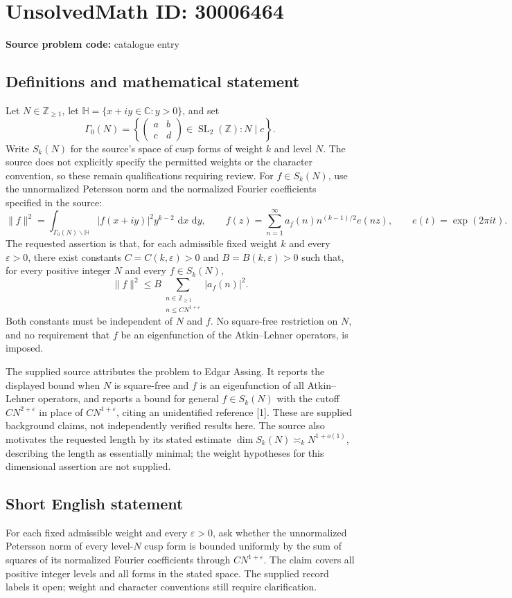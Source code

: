 \documentclass[11pt]{article}
\newcommand{\Z}{\mathbb{Z}}
\newcommand{\C}{\mathbb{C}}
\newcommand{\dd}{\,\mathrm{d}}
\begin{document}
\section*{UnsolvedMath ID: 30006464}
\textbf{Source problem code:} catalogue entry
\subsection{Definitions and mathematical statement}
Let \(N\in\Z_{\geq 1}\), let \(\mathbb H=\{x+iy\in\C:y>0\}\), and set
\[
\Gamma_0(N)=\left\{\begin{pmatrix}a&b\\c&d\end{pmatrix}\in\operatorname{SL}_2(\Z):N\mid c\right\}.
\]
Write \(S_k(N)\) for the source's space of cusp forms of weight \(k\) and level \(N\). The source does not explicitly specify the permitted weights or the character convention, so these remain qualifications requiring review. For \(f\in S_k(N)\), use the unnormalized Petersson norm and the normalized Fourier coefficients specified in the source:
\[
\|f\|^2=\int_{\Gamma_0(N)\backslash\mathbb H}|f(x+iy)|^2y^{k-2}\,\dd x\,\dd y,
\qquad
f(z)=\sum_{n=1}^{\infty}a_f(n)n^{(k-1)/2}e(nz),
\qquad e(t)=\exp(2\pi i t).
\]
The requested assertion is that, for each admissible fixed weight \(k\) and every \(\varepsilon>0\), there exist constants \(C=C(k,\varepsilon)>0\) and \(B=B(k,\varepsilon)>0\) such that, for every positive integer \(N\) and every \(f\in S_k(N)\),
\[
\|f\|^2\leq B\sum_{\substack{n\in\Z_{\geq1}\\n\leq C N^{1+\varepsilon}}}|a_f(n)|^2.
\]
Both constants must be independent of \(N\) and \(f\). No square-free restriction on \(N\), and no requirement that \(f\) be an eigenfunction of the Atkin--Lehner operators, is imposed.

The supplied source attributes the problem to Edgar Assing. It reports the displayed bound when \(N\) is square-free and \(f\) is an eigenfunction of all Atkin--Lehner operators, and reports a bound for general \(f\in S_k(N)\) with the cutoff \(C N^{2+\varepsilon}\) in place of \(C N^{1+\varepsilon}\), citing an unidentified reference [1]. These are supplied background claims, not independently verified results here. The source also motivates the requested length by its stated estimate \(\dim S_k(N)\asymp_k N^{1+o(1)}\), describing the length as essentially minimal; the weight hypotheses for this dimensional assertion are not supplied.
\subsection{Short English statement}
For each fixed admissible weight and every \(\varepsilon>0\), ask whether the unnormalized Petersson norm of every level-\(N\) cusp form is bounded uniformly by the sum of squares of its normalized Fourier coefficients through \(C N^{1+\varepsilon}\). The claim covers all positive integer levels and all forms in the stated space. The supplied record labels it open; weight and character conventions still require clarification.
\end{document}
